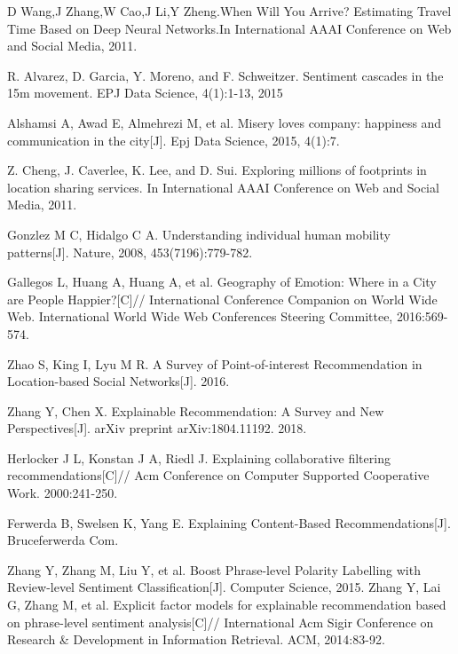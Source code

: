 \documentclass[runningheads]{llncs}
\begin{document}
\begin{thebibliography}{25}
D Wang,J Zhang,W Cao,J Li,Y Zheng.When Will You Arrive? Estimating Travel Time Based on Deep Neural Networks.In International AAAI Conference on Web and Social Media, 2011.
 
R. Alvarez, D. Garcia, Y. Moreno, and F. Schweitzer. Sentiment cascades in the 15m movement. EPJ Data Science, 4(1):1-13, 2015

Alshamsi A, Awad E, Almehrezi M, et al. Misery loves company: happiness and communication in the city[J]. Epj Data Science, 2015, 4(1):7.

Z. Cheng, J. Caverlee, K. Lee, and D. Sui. Exploring millions of footprints in location sharing services. In International AAAI Conference on Web and Social Media, 2011.

Gonzlez M C, Hidalgo C A. Understanding individual human mobility patterns[J]. Nature, 2008, 453(7196):779-782.

Gallegos L, Huang A, Huang A, et al. Geography of Emotion: Where in a City are People Happier?[C]// International Conference Companion on World Wide Web. International World Wide Web Conferences Steering Committee, 2016:569-574.

Zhao S, King I, Lyu M R. A Survey of Point-of-interest Recommendation in Location-based Social Networks[J]. 2016.

 Zhang Y, Chen X. Explainable Recommendation: A Survey and New Perspectives[J]. arXiv preprint arXiv:1804.11192. 2018.
  
 Herlocker J L, Konstan J A, Riedl J. Explaining collaborative filtering recommendations[C]// Acm Conference on Computer Supported Cooperative Work. 2000:241-250.
 
 Ferwerda B, Swelsen K, Yang E. Explaining Content-Based Recommendations[J]. Bruceferwerda Com.
 
  Zhang Y, Zhang M, Liu Y, et al. Boost Phrase-level Polarity Labelling with Review-level Sentiment Classification[J]. Computer Science, 2015.
    Zhang Y, Lai G, Zhang M, et al. Explicit factor models for explainable recommendation based on phrase-level sentiment analysis[C]// International Acm Sigir Conference on Research \& Development in Information Retrieval. ACM, 2014:83-92.


\end{thebibliography}
\end{document}
